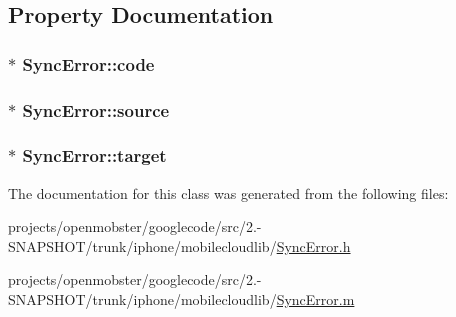 \subsection{\-Property \-Documentation}
\hypertarget{interface_sync_error_a262f3e0883b59db9797fa0b4ee079716}{
\subsubsection[{code}]{$\ast$ \-Sync\-Error\-::code}}
\label{interface_sync_error_a262f3e0883b59db9797fa0b4ee079716}
\hypertarget{interface_sync_error_a2afbdf877722b936ba239d7d9eef7631}{
\subsubsection[{source}]{$\ast$ \-Sync\-Error\-::source}}
\label{interface_sync_error_a2afbdf877722b936ba239d7d9eef7631}
\hypertarget{interface_sync_error_a213373ca10f69e4e7def8f9cfab3c542}{
\subsubsection[{target}]{$\ast$ \-Sync\-Error\-::target}}
\label{interface_sync_error_a213373ca10f69e4e7def8f9cfab3c542}


\-The documentation for this class was generated from the following files\-:\begin{DoxyCompactItemize}
\item 
projects/openmobster/googlecode/src/2.-\/\-S\-N\-A\-P\-S\-H\-O\-T/trunk/iphone/mobilecloudlib/\hyperlink{_sync_error_8h}{\-Sync\-Error.\-h}\item 
projects/openmobster/googlecode/src/2.-\/\-S\-N\-A\-P\-S\-H\-O\-T/trunk/iphone/mobilecloudlib/\hyperlink{_sync_error_8m}{\-Sync\-Error.\-m}\end{DoxyCompactItemize}
